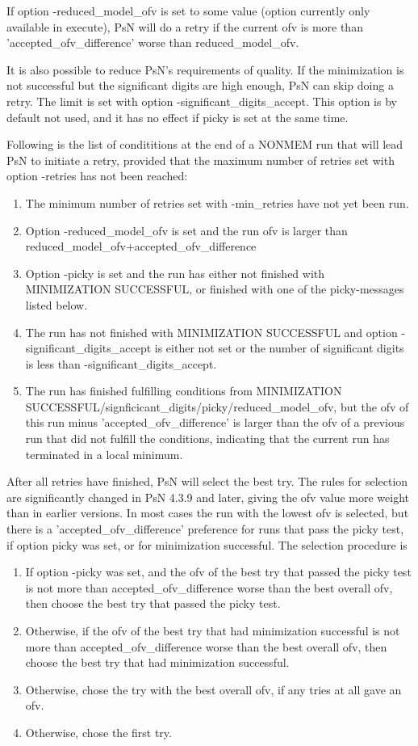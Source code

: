 If option -reduced\_model\_ofv is set to some value (option currently only available in execute),
PsN will do a retry if the current ofv is more than 'accepted\_ofv\_difference' worse than
reduced\_model\_ofv.

It is also possible to reduce PsN's requirements of quality. If the minimization is not successful but the significant 
digits are high enough, PsN can skip doing a retry. The limit is set with option -significant\_digits\_accept. This option 
is by default not used, and it has no effect if picky is set at the same time.

Following is the list of condititions at the end of a NONMEM run that will lead PsN to initiate a retry, provided that 
the maximum number of retries set with option -retries has not been reached:

\begin{enumerate}
\item The minimum number of retries set with -min\_retries have not yet been run.
\item Option -reduced\_model\_ofv is set and the run ofv is larger than reduced\_model\_ofv+accepted\_ofv\_difference
\item Option -picky is set and the run has either not finished with MINIMIZATION SUCCESSFUL, or finished with one of the picky-messages listed below.
\item The run has not finished with MINIMIZATION SUCCESSFUL and option -significant\_digits\_accept is 
either not set or the number of significant digits is less than -significant\_digits\_accept.
\item The run has finished fulfilling conditions from MINIMIZATION SUCCESSFUL/signficicant\_digits/picky/reduced\_model\_ofv, 
but the ofv of this run minus 'accepted\_ofv\_difference' is larger than the ofv of a previous run 
that did not fulfill the conditions, indicating that the current run has terminated in a local minimum.
\end{enumerate}

After all retries have finished, PsN will select the best try. 
The rules for selection are significantly changed in PsN 4.3.9 and later, giving the ofv value more weight than in earlier versions.
In most cases the run with the lowest ofv is selected, but there is a 'accepted\_ofv\_difference' preference for runs
that pass the picky test, if option picky was set, or for minimization successful.
The selection procedure is 
\begin{enumerate}
\item If option -picky was set, and the ofv of the best try that passed the picky test is not more than accepted\_ofv\_difference
worse than the best overall ofv, then choose the best try that passed the picky test. 
\item Otherwise, if the ofv of the best try that had minimization successful is not more than accepted\_ofv\_difference
worse than the best overall ofv, then choose the best try that had minimization successful.
\item Otherwise, chose the try with the best overall ofv, if any tries at all gave an ofv.
\item Otherwise, chose the first try.
\end{enumerate}

